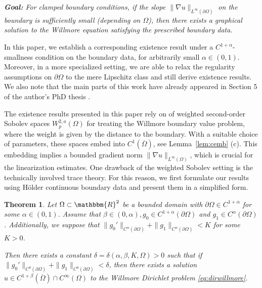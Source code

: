 \documentclass[12pt,a4paper,twoside]{article}
\newcommand{\R}{\mathbbm {R}}
\newtheorem{thm}{Theorem}
\begin{document}
\emph{\textbf{Goal:} For clamped boundary conditions, if the slope $\| \nabla u \|_{L^\infty(\partial\Omega)}$  on the boundary is sufficiently small (depending on $\Omega$), then there exists a graphical solution to the Willmore equation satisfying the prescribed boundary data.}

In this paper, we establish a corresponding existence result under a $C^{1+\alpha}$-smallness condition on the boundary data, for arbitrarily small $\alpha\in(0,1)$. Moreover, in a more specialized setting, we are able to relax the regularity assumptions on $\partial\Omega$ to the mere Lipschitz class and still derive existence results. We also note that the main parts of this work have already appeared in Section 5 of the author's PhD thesis \cite{gulyak2024boundary}.

The existence results presented in this paper rely on  of weighted second-order Sobolev spaces $W^{2,a}_p(\Omega)$ for treating the Willmore boundary value problem, where the weight is given by the distance to the boundary. With a suitable choice of parameters, these spaces embed into $C^1(\overline{\Omega})$, see Lemma~\ref{lem:cemb} (c). This embedding implies a bounded gradient norm $\|\nabla u\|_{L^\infty(\Omega)}$,  which is crucial for the linearization estimates. 
One drawback of the weighted Sobolev setting is the technically involved trace theory. For this reason, we first formulate our results using Hölder continuous boundary data and present them in a simplified form.

\begin{thm}
   \label{thm:weightedmainhoelder}
Let $\Omega\subset\R^2$ be a bounded domain with $\partial\Omega\in C^{1+\alpha}$ for some $\alpha\in(0,1)$. Assume that $\beta\in(0,\alpha), g_0\in C^{1+\alpha}(\partial\Omega)$ and $g_1\in C^{\alpha}(\partial\Omega)$. Additionally, we suppose that $\|g_0'\|_{C^{\alpha}(\partial\Omega)}+ \|g_1\|_{C^{\alpha}(\partial\Omega)} <K$ for some $K>0$. 

Then there exists a constant $\delta=\delta(\alpha,\beta, K, \Omega)>0$ such that if $\|g_0'\|_{C^0(\partial\Omega)}+\|g_1\|_{C^{0}(\partial\Omega)}<\delta$, then there exists a solution $u\in C^{1+\beta}(\overline\Omega)\cap C^\infty(\Omega)$ to the Willmore Dirichlet problem \eqref{eq:dirwillmore}.
\end{thm}
\end{document}
